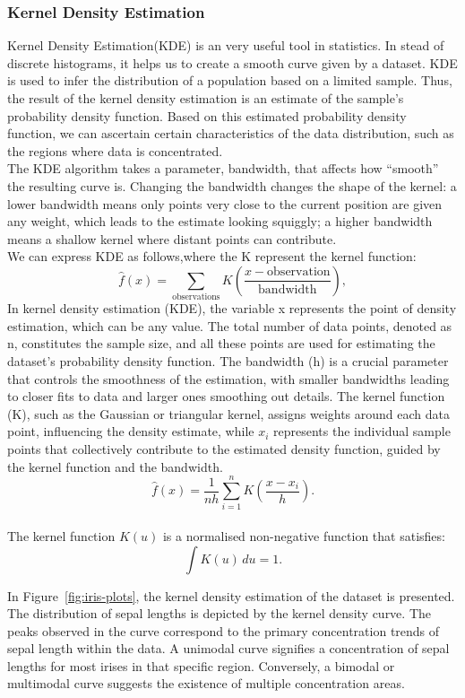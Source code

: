 \documentclass{article}\usepackage[]{graphicx}\usepackage[]{xcolor}
\begin{document}
\subsubsection{Kernel Density Estimation}

Kernel Density Estimation(KDE) is an very useful tool in statistics. In stead of discrete histograms, it helps us to create a smooth curve given by a dataset. KDE is used to infer the distribution of a population based on a limited sample. Thus, the result of the kernel density estimation is an estimate of the sample's probability density function. Based on this estimated probability density function, we can ascertain certain characteristics of the data distribution, such as the regions where data is concentrated.\\

\noindent
The KDE algorithm takes a parameter, bandwidth, that affects how “smooth” the resulting curve is. Changing the bandwidth changes the shape of the kernel: a lower bandwidth means only points very close to the current position are given any weight, which leads to the estimate looking squiggly; a higher bandwidth means a shallow kernel where distant points can contribute.\\

\noindent
We can express KDE as follows,where the K represent the kernel function:
$$\hat{f}(x) = \sum_{\text{observations}} K\left(\frac{x - \text{observation}}{\text{bandwidth}}\right),$$
In kernel density estimation (KDE), the variable x represents the point of density estimation, which can be any value. The total number of data points, denoted as n, constitutes the sample size, and all these points are used for estimating the dataset's probability density function. The bandwidth (h) is a crucial parameter that controls the smoothness of the estimation, with smaller bandwidths leading to closer fits to data and larger ones smoothing out details. The kernel function (K), such as the Gaussian or triangular kernel, assigns weights around each data point, influencing the density estimate, while $x_i$ represents the individual sample points that collectively contribute to the estimated density function, guided by the kernel function and the bandwidth.
$$\hat{f}(x) = \frac{1}{nh} \sum_{i=1}^{n} K\left(\frac{x - x_i}{h}\right).$$\\
The kernel function \( K(u) \) is a normalised non-negative function that satisfies:
\[ \int K(u) \, du = 1. \]

\noindent In Figure~\ref{fig:iris-plots}, the kernel density estimation of the dataset is presented. The distribution of sepal lengths is depicted by the kernel density curve. The peaks observed in the curve correspond to the primary concentration trends of sepal length within the data. A unimodal curve signifies a concentration of sepal lengths for most irises in that specific region. Conversely, a bimodal or multimodal curve suggests the existence of multiple concentration areas.
\end{document}
